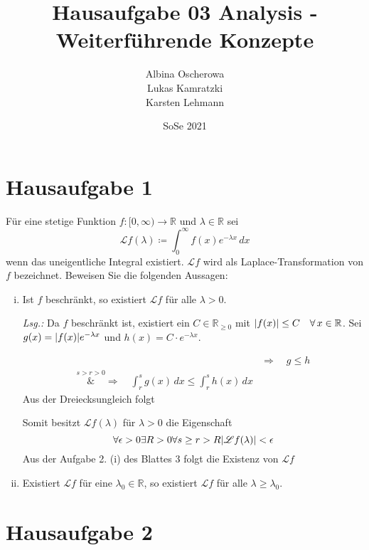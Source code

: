\documentclass{article}
\author{Albina Oscherowa \\ Lukas Kamratzki \\ Karsten Lehmann}
\date{SoSe 2021}
\title{Hausaufgabe 03 Analysis - Weiterführende Konzepte}
\begin{document}
\section*{Hausaufgabe 1}

Für eine stetige Funktion $f \colon [0, \infty) \to \mathbb{R}$ und
$\lambda \in \mathbb{R}$ sei
\[
  \mathscr{L}f(\lambda) \coloneqq \int_0^{\infty} f(x)e^{-\lambda x}\,dx
\]
wenn das uneigentliche Integral existiert.
$\mathscr{L}f$ wird als Laplace-Transformation von $f$ bezeichnet.
Beweisen Sie die folgenden Aussagen:
\begin{enumerate}[(i)]
\item Ist $f$ beschränkt, so existiert $\mathscr{L}f$ für alle $\lambda > 0$.

  \textit{Lsg.:} Da $f$ beschränkt ist, existiert ein $C \in \mathbb{R}_{\geq 0}$
  mit $\abs{f(x)} \leq C \quad \forall \, x \in \mathbb{R}$.
  Sei $g(x) = \abs{f(x)} e^{-\lambda x}$ und $h(x) = C \cdot e^{-\lambda x}$.
  
  \begin{align*}
    &\Rightarrow \quad g \leq  h  \\
    \overset{s > r > 0}&\Rightarrow \quad \int_r^s g(x)\,dx \leq \int_r^s h(x)\,dx
  \end{align*}
  Aus der Dreiecksungleich folgt
  Somit besitzt $\mathscr{L}f(\lambda)$ für $\lambda > 0$ die Eigenschaft
  \[
    \forall \epsilon > 0 \exists R > 0 \forall s \geq r > R \abs{\mathscr{L}f(\lambda)} < \epsilon
  \]
  Aus der Aufgabe 2. (i) des Blattes 3 folgt die Existenz von $\mathscr{L}f$
  
\item Existiert $\mathscr{L}f$ für eine $\lambda_0 \in \mathbb{R}$, so existiert
  $\mathscr{L}f$ für alle $\lambda \geq \lambda_0$.
\end{enumerate}

\newpage
\section*{Hausaufgabe 2}
\end{document}

